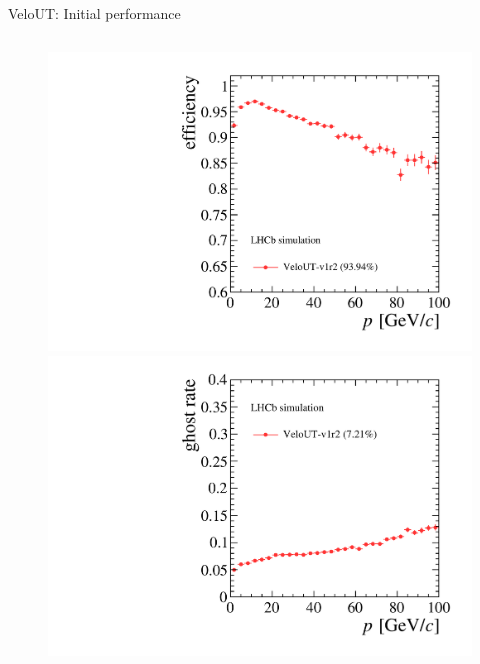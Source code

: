 \documentclass[aspectratio=1610]{beamer}
\begin{document}
\begin{frame}{VeloUT: Initial performance}
\begin{columns}
\begin{column}{0.35\textwidth}
\centering
\begin{figure}
\vspace*{-1cm}
\includegraphics[height=0.475\textheight]{figs/upstream-tracking-upgrade/eff_p_v1r2.pdf}\\
\includegraphics[height=0.475\textheight]{figs/upstream-tracking-upgrade/gr_p_v1r2.pdf}
\end{figure}
\end{column}
\end{columns}

\end{frame}
\end{document}
